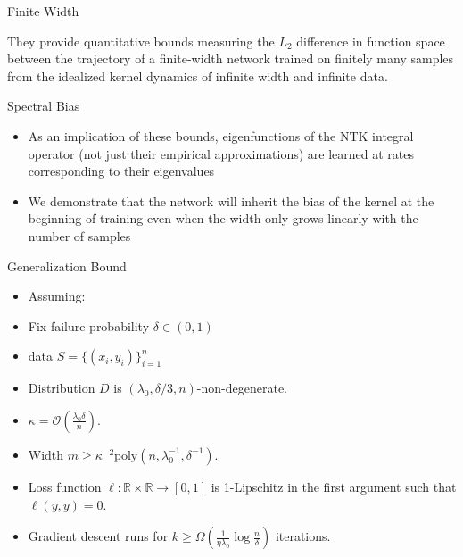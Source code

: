 \documentclass[serif, aspectratio=169]{beamer}
\begin{document}
\begin{frame}{Finite Width}
	
They provide quantitative bounds measuring the \(L_
2\) difference in function space between the trajectory of a finite-width network trained on finitely many samples from the idealized kernel dynamics
of infinite width and infinite data.
	
\end{frame}


\begin{frame}{Spectral Bias}
	\begin{itemize}

	\item As an implication of these bounds, eigenfunctions of the NTK integral operator (not just their empirical approximations) are learned at rates corresponding to their eigenvalues
	 
	\item We demonstrate that the network will inherit the bias of the kernel at the beginning of training
	even when the width only grows linearly with the number of samples
	
	\end{itemize}
\end{frame}





\begin{frame}{Generalization Bound}


\begin{itemize}
	\item Assuming:
		\item Fix failure probability \(\delta \in (0,1)\)
		\item data \(S = \{(x_i,y_i)\}_{i=1}^n\)
		\item Distribution \( D \) is \( (\lambda_0, \delta/3, n) \)-non-degenerate.
		\item \( \kappa = \mathcal{O}\left( \frac{\lambda_0 \delta}{n} \right) \).
		\item Width \( m \geq \kappa^{-2} \text{poly}(n, \lambda_0^{-1}, \delta^{-1}) \).
		\item Loss function \( \ell: \mathbb{R} \times \mathbb{R} \to [0, 1] \) is 1-Lipschitz in the first
		argument such that \( \ell(y, y) = 0 \).
		\item Gradient descent runs for \( k \geq \Omega\left( \frac{1}{\eta \lambda_0} \log \frac{n}{\delta} \right) \) iterations.
	

\end{itemize}

\end{frame}
\end{document}
